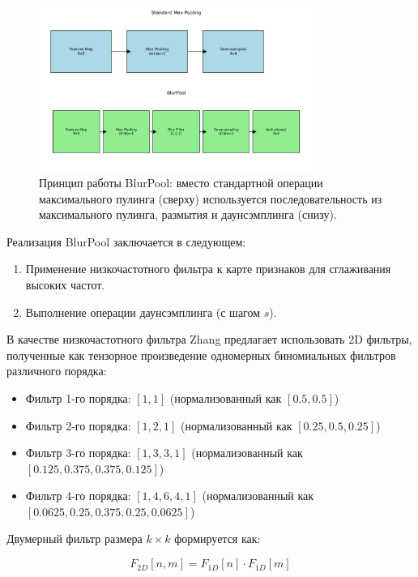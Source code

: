 \begin{figure}[ht]
\centering
\includegraphics[width=0.8\textwidth]{Dissertation/images/blurpool_illustration.png}
\caption{Принцип работы BlurPool: вместо стандартной операции максимального пулинга (сверху) используется последовательность из максимального пулинга, размытия и даунсэмплинга (снизу).}
\label{fig:blurpool_illustration}
\end{figure}

Реализация BlurPool заключается в следующем:

\begin{enumerate}
    \item Применение низкочастотного фильтра к карте признаков для сглаживания высоких частот.
    \item Выполнение операции даунсэмплинга (с шагом $s$).
\end{enumerate}

В качестве низкочастотного фильтра Zhang предлагает использовать 2D фильтры, полученные как тензорное произведение одномерных биномиальных фильтров различного порядка:

\begin{itemize}
    \item Фильтр 1-го порядка: $[1, 1]$ (нормализованный как $[0.5, 0.5]$)
    \item Фильтр 2-го порядка: $[1, 2, 1]$ (нормализованный как $[0.25, 0.5, 0.25]$)
    \item Фильтр 3-го порядка: $[1, 3, 3, 1]$ (нормализованный как $[0.125, 0.375, 0.375, 0.125]$)
    \item Фильтр 4-го порядка: $[1, 4, 6, 4, 1]$ (нормализованный как $[0.0625, 0.25, 0.375, 0.25, 0.0625]$)
\end{itemize}

Двумерный фильтр размера $k \times k$ формируется как:

\begin{equation}
F_{2D}[n,m] = F_{1D}[n] \cdot F_{1D}[m]
\end{equation}

